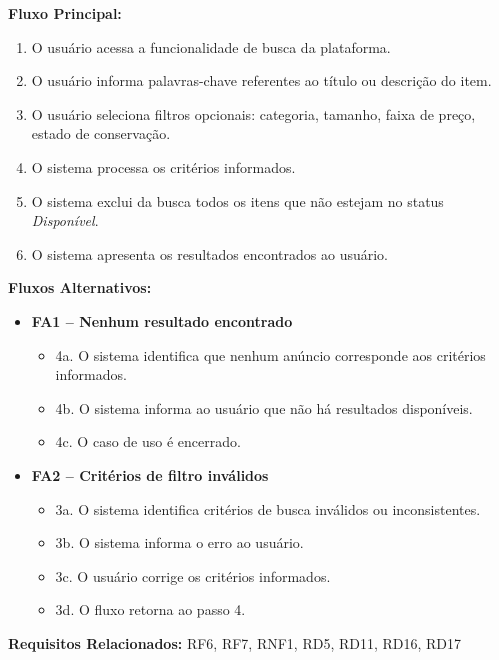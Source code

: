 \documentclass[
	article,			%
	11pt,				%
	oneside,			%
	a4paper,			%
	english,			%
	brazil,				%
	sumario=tradicional
	]{abntex2}
\begin{document}
\vspace{0.5em}
\noindent\textbf{Fluxo Principal:}
\begin{enumerate}[label=\arabic*.]
    \item O usuário acessa a funcionalidade de busca da plataforma.
    \item O usuário informa palavras-chave referentes ao título ou descrição do item.
    \item O usuário seleciona filtros opcionais: categoria, tamanho, faixa de preço, estado de conservação.
    \item O sistema processa os critérios informados.
    \item O sistema exclui da busca todos os itens que não estejam no status \textit{Disponível}.
    \item O sistema apresenta os resultados encontrados ao usuário.
\end{enumerate}

\vspace{0.5em}
\noindent\textbf{Fluxos Alternativos:}
\begin{itemize}[leftmargin=*]
    \item \textbf{FA1 – Nenhum resultado encontrado}
    \begin{itemize}[label={}, leftmargin=0.5cm]
        \item 4a. O sistema identifica que nenhum anúncio corresponde aos critérios informados.
        \item 4b. O sistema informa ao usuário que não há resultados disponíveis.
        \item 4c. O caso de uso é encerrado.
    \end{itemize}
    
    \item \textbf{FA2 – Critérios de filtro inválidos}
    \begin{itemize}[label={}, leftmargin=0.5cm]
        \item 3a. O sistema identifica critérios de busca inválidos ou inconsistentes.
        \item 3b. O sistema informa o erro ao usuário.
        \item 3c. O usuário corrige os critérios informados.
        \item 3d. O fluxo retorna ao passo 4.
    \end{itemize}
\end{itemize}

\vspace{0.5em}
\noindent\textbf{Requisitos Relacionados:} RF6, RF7, RNF1, RD5, RD11, RD16, RD17
\end{document}
